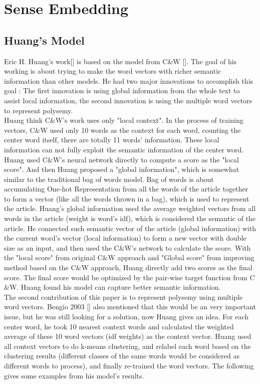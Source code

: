 \chapter{Sense Embedding}
\label{cha:related}




\section{Huang's Model}


Eric H. Huang's work[] is based on the model from C$\&$W []. The goal of his working is about trying to make the word vectors with richer semantic information than other models. He had two major innovations to accomplish this goal : The first innovation is using global information from the whole text to assist local information, the second innovation is using the multiple word vectors to represent polysemy. \\

Huang think C$\&$W's work uses only "local context". In the process of training vectors, C$\&$W used only 10 words as the context for each word, counting the center word itself, there are totally 11 words' information. 
These local information can not fully exploit the semantic information of the center word. Huang used C$\&$W's neural network directly to compute a score as the "local score". 
And then Huang proposed a "global information", which is somewhat similar to the traditional bag of words model. Bag of words is about accumulating One-hot Representation from all the words of the article together to form a vector (like all the words thrown in a bag), which is used to represent the article. Huang's global information used the average weighted vectors from all words in the article (weight is word's idf), which is considered the semantic of the article. 
He connected such semantic vector of the article (global information) 
with the current word's vector (local information)
 to 
 form 
a new vector with 
double size as an input, 
and then used the C$\&$W's network to calculate the score. 
With the "local score" from original C$\&$W approach and "Global score" from improving method based on the C$\&$W approach, Huang directly add two scores as the final score. The final score would be optimized by the pair-wise target function from C$\&$W. Huang found his model can capture better semantic information. \\

The second contribution of this paper is to represent polysemy using multiple word vectors. Bengio 2003 [] also mentioned that this would be an very important issue, but he was still looking for a solution, now Huang gives an idea. For each center word, he took 10 nearest context words and calculated the weighted average of these 10 word vectors (idf weights) as the context vector. Huang used all context vectors to do k-means clustering, and relabel  each word based on the clustering results (different classes of the same words would be considered as different words to process), and finally re-trained the word vectors. The following gives some examples from his model's results.



